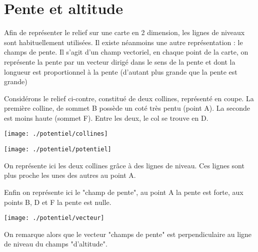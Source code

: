
\section{Pente et altitude}
%
Afin de représenter le relief sur une carte en 2 dimension, les lignes de niveaux sont habituellement utilisées. Il existe néanmoins une autre représentation : le champs de pente. Il s'agit d'un champ vectoriel, en chaque point de la carte, on représente la pente par un vecteur dirigé dans le sens de la pente et dont la longueur est proportionnel à la pente (d'autant plus grande que la pente est grande)

\vspace{0.97cm}
\begin{minipage}{0.45\textwidth}
Considérons le relief ci-contre, constitué de deux collines, représenté en coupe. La première colline, de sommet B possède un coté très pentu (point A). La seconde est moins haute (sommet F). Entre les deux, le col se trouve en D.
\end{minipage}
\hfill
\begin{minipage}{0.45\textwidth}
\begin{center}
\texttt{[image: ./potentiel/collines]}
\end{center}
\end{minipage}

\vspace{0.97cm}
\begin{minipage}{0.45\textwidth}
\begin{center}
\texttt{[image: ./potentiel/potentiel]}
\end{center}
\end{minipage}
\hfill
\begin{minipage}{0.45\textwidth}
On représente ici les deux collines grâce à des lignes de niveau. Ces lignes sont plus proche les unes des autres au point A.
\end{minipage}

\vspace{0.97cm}
\begin{minipage}{0.45\textwidth}
Enfin on représente ici le "champ de pente", au point A la pente est forte, aux points B, D et F la pente est nulle.
\end{minipage}
\hfill
\begin{minipage}{0.45\textwidth}
\begin{center}
\texttt{[image: ./potentiel/vecteur]}
\end{center}
\end{minipage}

\vspace{0.97cm}
On remarque alors que le vecteur "champs de pente" est perpendiculaire au ligne de niveau du champs "d'altitude".

